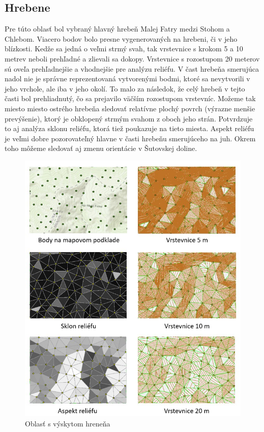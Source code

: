 \documentclass[12pt]{article}
\begin{document}
\subsection*{Hrebene}
Pre túto oblasť bol vybraný hlavný hrebeň Malej Fatry medzi Stohom a Chlebom. Viacero bodov bolo presne vygenerovaných na hrebeni, či v jeho blízkosti. Kedže sa jedná o veľmi strmý svah, tak vrstevnice s krokom 5 a 10 metrev neboli prehľadné a zlievali sa dokopy. Vrstevnice s rozostupom 20 meterov sú oveľa prehľadnejšie a vhodnejšie pre analýzu reliéfu. V čast hrebeňa smerujúca nadol nie je správne reprezentovaná vytvorenými bodmi, ktoré sa nevytvorili v jeho vrchole, ale iba v jeho okolí. To malo za následok, že celý hrebeň v tejto časti bol prehliadnutý, čo sa prejavilo väčším rozostupom vrstevníc. Možeme tak miesto miesto ostrého hrebeňa sledovať relatívne plochý povrch (výrazne menšie prevýšenie), ktorý je obklopený strmým svahom z oboch jeho strán. Potvrdzuje to aj analýza sklonu reliéfu, ktorá tiež poukazuje na tieto miesta. Aspekt reliéfu je veľmi dobre pozorovateľný hlavne v časti hrebeňu smerujúceho na juh. Okrem toho môžeme sledovať aj zmenu orientácie v Šutovskej doline.  

\begin{figure}[h]
    \centering
    \includegraphics[width=0.56\linewidth]{latex/images/chrbat.jpg}
    \caption{Oblasť s výskytom hreneňa}
    \label{fig:enter-label}
\end{figure}
\newpage
\end{document}
